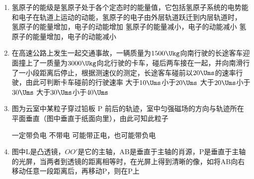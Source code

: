 \documentclass[\gkver]{gaokaozhenti}
\begin{document}
\begin{enumerate}
\item
氢原子的能级是氢原子处于各个定态时的能量值，它包括氢原子系统的电势能和电子在轨道上运动的动能，氢原子的电子由外层轨道跃迁到内层轨道时，
{氢原子的能量增加，电子的动能增加}
{氢原子的能量减小，电子的动能减小}
{氢原子的能量增加，电子的动能减小}

\item
在高速公路上发生一起交通事故，一辆质量为$1500\Ukg$向南行驶的长途客车迎面撞上了一质量为$3000\Ukg$向北行驶的卡车，碰后两车接在一起，并向南滑行了一小段距离后停止，根据测速仪的测定，长途客车碰前以$20\Ums$的速率行驶，由此可判断卡车碰前的行驶速率
{大于$10\Ums$小于$20\Ums$}
{大于$20\Ums$小于$30\Ums$}
{大于$30\Ums$小于$40\Ums$}

\item
图为云室中某粒子穿过铅板 P 前后的轨迹，室中匀强磁场的方向与轨迹所在平面垂直（图中垂直于纸面向里），由此可知此粒子


{一定带负电}
{不带电}
{可能带正电，也可能带负电}

\item
图中L是凸透镜，$OO'$是它的主轴，AB是垂直于主轴的肖源，P是垂直于主轴的光屏，当两者到透镜的距离相等时，在光屏上得到清晰的像，如将AB向右移动任意一段距离后，再移动P，则在P上



\end{enumerate}
\end{document}
